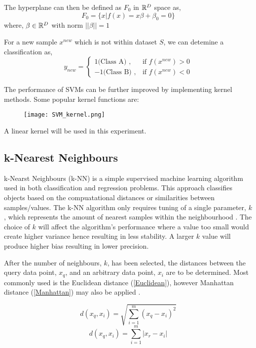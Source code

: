 The hyperplane can then be defined as $F_0$ in $\mathbb{R}^D$ space as,
\begin{equation}
    F_0 = \big \{x|f(x) = x \beta + \beta_0 = 0 \big \} 
\end{equation}  
where, 
$\beta \in \mathbb{R}^D$ with norm $||\beta|| = 1$

For a new sample $x^{new}$ which is not within dataset $S$, we can detemine a classification as,
\begin{equation}
    y_{new} = \begin{cases}
        1 \text{(Class A) }, & \text{if } f(x^{new}) > 0 \\
        -1 \text{(Class B) }, & \text{if } f(x^{new}) < 0
    \end{cases}
\end{equation}

The performance of SVMs can be further improved by implementing kernel methods. Some popular kernel functions are:
\begin{figure}[h]
    \texttt{[image: SVM\_kernel.png]}
    \centering
    \label{fig:kernel}
\end{figure}

A linear kernel will be used in this experiment.

\subsection{k-Nearest Neighbours}
k-Nearst Neighbours (k-NN) is a simple supervised machine learning algorithm used in both classification and regression problems. 
This approach classifies objects based on the compuatational distances or similarities between samples/values.
The k-NN algorithm only requires tuning of a single parameter, $k$, which represents the amount of nearest samples within the neighbourhood \cite{d163fd27cc414d1a806b3e2db0164bfc}.
The choice of $k$ will affect the algorithm's performance where a value too small would create higher variance hence resulting in less stability.
A larger $k$ value will produce higher bias resulting in lower precision. 

After the number of neighbours, $k$, has been selected, the distances between the query data point, $x_q$, and an arbitrary data point, $x_i$ are to be determined.
Most commonly used is the Euclidean distance (\ref{Euclidean}), however Manhattan distance (\ref{Manhattan}) may also be applied \cite{knn}.

\begin{equation} \label{Euclidean}
    d(x_q,x_i) = \sqrt{\sum_{i=1}^{m} (x_q - x_i)^2}
\end{equation}
\begin{equation} \label{Manhattan}
    d(x_q,x_i) = \sum_{i=1}^{m} \lvert x_r - x_i \rvert
\end{equation}

